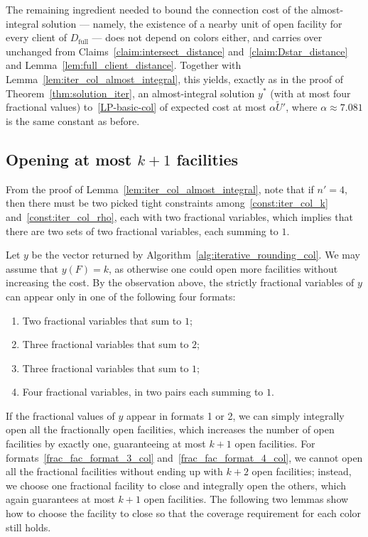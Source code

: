 The remaining ingredient needed to bound the connection cost of the almost-integral solution — namely, the existence of a nearby unit of open facility for every client of $D_\text{full}$ — does not depend on colors either, and carries over unchanged from Claims~\ref{claim:intersect_distance} and~\ref{claim:Dstar_distance} and Lemma~\ref{lem:full_client_distance}. Together with Lemma~\ref{lem:iter_col_almost_integral}, this yields, exactly as in the proof of Theorem~\ref{thm:solution_iter}, an almost-integral solution $y^*$ (with at most four fractional values) to~\eqref{LP-basic-col} of expected cost at most $\alpha \tilde{U}'$, where $\alpha \approx 7.081$ is the same constant as before.

\subsection{Opening at most $k+1$ facilities}

From the proof of Lemma~\ref{lem:iter_col_almost_integral}, note that if $n' = 4$, then there must be two picked tight constraints among~\eqref{const:iter_col_k} and~\eqref{const:iter_col_rho}, each with two fractional variables, which implies that there are two sets of two fractional variables, each summing to $1$.

Let $y$ be the vector returned by {Algorithm~\ref{alg:iterative_rounding_col}}. We may assume that $y(F) = k$, as otherwise one could open more facilities without increasing the cost. By the observation above, the strictly fractional variables of $y$ can appear only in one of the following four formats:
\begin{enumerate}
    \item Two fractional variables that sum to $1$;
    \item Three fractional variables that sum to $2$;
    \item Three fractional variables that sum to $1$; \label{frac_fac_format_3_col}
    \item Four fractional variables, in two pairs each summing to $1$. \label{frac_fac_format_4_col}
\end{enumerate}

If the fractional values of $y$ appear in formats 1 or 2, we can simply integrally open all the fractionally open facilities, which increases the number of open facilities by exactly one, guaranteeing at most $k+1$ open facilities. For formats~\ref{frac_fac_format_3_col} and~\ref{frac_fac_format_4_col}, we cannot open all the fractional facilities without ending up with $k+2$ open facilities; instead, we choose one fractional facility to close and integrally open the others, which again guarantees at most $k+1$ open facilities. The following two lemmas show how to choose the facility to close so that the coverage requirement for each color still holds.

